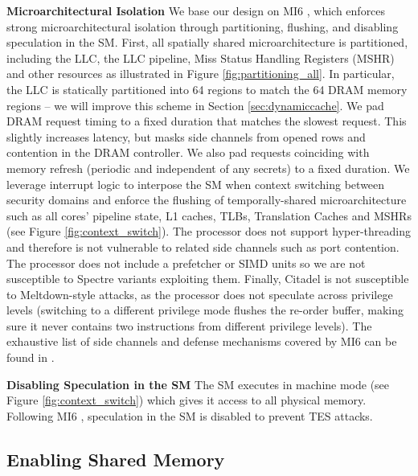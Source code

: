 \noindent\textbf{Microarchitectural Isolation}
We base our design on MI6 \cite{bourgeat2019mi6}, which enforces strong microarchitectural isolation through partitioning, flushing, and disabling speculation in the SM.
First, all spatially shared microarchitecture is partitioned, including the LLC, the LLC pipeline, Miss Status Handling Registers (MSHR) and other resources as illustrated in Figure \ref{fig:partitioning_all}.
In particular, the LLC is statically partitioned into 64 regions to match the 64 DRAM memory regions -- we will improve this scheme in Section \ref{sec:dynamiccache}.
We pad DRAM request timing to a fixed duration that matches the slowest request. This slightly increases latency, but masks side channels from opened rows and contention in the DRAM controller.
We also pad requests coinciding with memory refresh (periodic and independent of any secrets) to a fixed duration.
We leverage interrupt logic to interpose the SM when context switching between security domains and enforce the flushing of temporally-shared microarchitecture such as all cores' pipeline state, L1 caches, TLBs, Translation Caches and MSHRs (see Figure \ref{fig:context_switch}).
The processor does not support hyper-threading and therefore is not vulnerable to related side channels such as port contention.
The processor does not include a prefetcher or SIMD units so we are not susceptible to Spectre variants exploiting them.
Finally, Citadel is not susceptible to Meltdown-style attacks, as the processor does not speculate across privilege levels (switching to a different privilege mode flushes the re-order buffer, making sure it never contains two instructions from different privilege levels).
The exhaustive list of side channels and defense mechanisms covered by MI6 can be found in \cite{bourgeat2019mi6}.

\noindent\textbf{Disabling Speculation in the SM}
The SM executes in machine mode (see Figure \ref{fig:context_switch}) which gives it access to all physical memory.
Following MI6 \cite{bourgeat2019mi6}, speculation in the SM is disabled to prevent TES attacks. 

\subsection{Enabling Shared Memory}
\label{sec:vmanddualpt}


